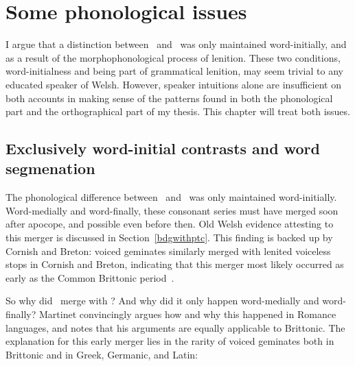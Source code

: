 \chapter{Some phonological issues}
I argue that a distinction between \lT\ and \xD\ was only maintained word-initially, and as a result of the morphophonological process of lenition. These two conditions, word-initialness and being part of grammatical lenition, may seem trivial to any educated speaker of Welsh. However, speaker intuitions alone are insufficient on both accounts in making sense of the patterns found in both the phonological part and the orthographical part of my thesis. This chapter will treat both issues.

\section{Exclusively word-initial contrasts and word segmenation}
The phonological difference between \lT\ and \xD\ was only maintained word-initially. Word-medially and word-finally, these consonant series must have merged soon after apocope, and possible even before then. Old Welsh evidence attesting to this merger is discussed in Section~\ref{bdgwithptc}. This finding is backed up by Cornish and Breton: voiced geminates similarly merged with lenited voiceless stops in Cornish and Breton, indicating that this merger most likely occurred as early as the Common Brittonic period~\textcite[31]{schrijver_old_2011}.


So why did \lT\ merge with \xD? And why did it only happen word-medially and word-finally? Martinet convincingly argues how and why this happened in Romance languages, and notes that his arguments are equally applicable to Brittonic. The explanation for this early merger lies in the rarity of voiced geminates both in Brittonic and in Greek, Germanic, and Latin: 

